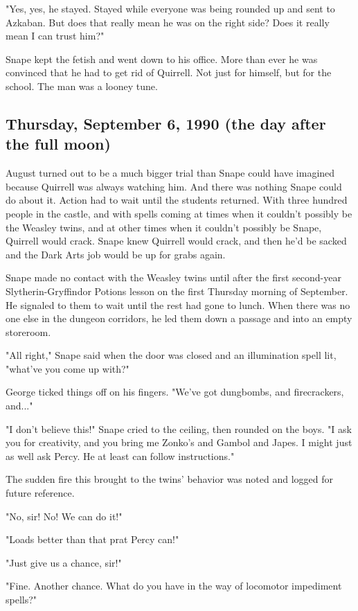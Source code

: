"Yes, yes, he stayed. Stayed while everyone was being rounded up and sent to Azkaban. But does that really mean he was on the right side? Does it really mean I can trust him?"

Snape kept the fetish and went down to his office. More than ever he was convinced that he had to get rid of Quirrell. Not just for himself, but for the school. The man was a looney tune.

\subsection{Thursday, September 6, 1990 (the day after the full moon)}

August turned out to be a much bigger trial than Snape could have imagined because Quirrell was always watching him. And there was nothing Snape could do about it. Action had to wait until the students returned. With three hundred people in the castle, and with spells coming at times when it couldn't possibly be the Weasley twins, and at other times when it couldn't possibly be Snape, Quirrell would crack. Snape knew Quirrell would crack, and then he'd be sacked and the Dark Arts job would be up for grabs again.

Snape made no contact with the Weasley twins until after the first second-year Slytherin-Gryffindor Potions lesson on the first Thursday morning of September. He signaled to them to wait until the rest had gone to lunch. When there was no one else in the dungeon corridors, he led them down a passage and into an empty storeroom.

"All right," Snape said when the door was closed and an illumination spell lit, "what've you come up with?"

George ticked things off on his fingers. "We've got dungbombs, and firecrackers, and..."

"I don't believe this!" Snape cried to the ceiling, then rounded on the boys. "I ask you for creativity, and you bring me Zonko's and Gambol and Japes. I might just as well ask Percy. He at least can follow instructions."

The sudden fire this brought to the twins' behavior was noted and logged for future reference.

"No, sir! No! We can do it!"

"Loads better than that prat Percy can!"

"Just give us a chance, sir!"

"Fine. Another chance. What do you have in the way of locomotor impediment spells?"

